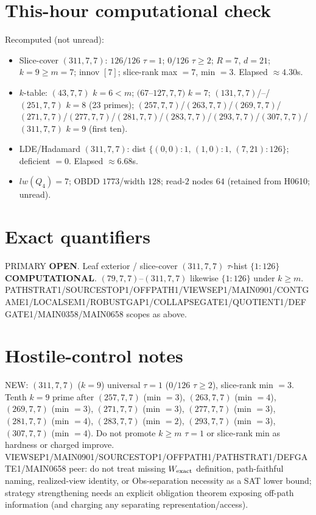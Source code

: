 \documentclass[11pt]{article}
\begin{document}
\section*{This-hour computational check}
Recomputed (not unread):
\begin{itemize}
\item Slice-cover $(311,7,7)$: $126/126$ $\tau{=}1$; $0/126$ $\tau{\ge}2$; $R{=}7$, $d{=}21$;
  $k{=}9{\ge}m{=}7$; innov $[7]$; slice-rank max $=7$, min $=3$. Elapsed $\approx4.30$s.
\item $k$-table: $(43,7,7)$ $k{=}6{<}m$; $(67$--$127,7,7)$ $k{=}7$;
  $(131,7,7)$/--/$(251,7,7)$ $k{=}8$ (23 primes); $(257,7,7)$/$(263,7,7)$/$(269,7,7)$/$(271,7,7)$/$(277,7,7)$/$(281,7,7)$/$(283,7,7)$/$(293,7,7)$/$(307,7,7)$/$(311,7,7)$ $k{=}9$ (first ten).
\item LDE/Hadamard $(311,7,7)$: dist $\{(0,0){:}1,\,(1,0){:}1,\,(7,21){:}126\}$; deficient $=0$. Elapsed $\approx6.68$s.
\item $lw(Q_4)=7$; OBDD $1773$/width $128$; read-$2$ nodes $64$ (retained from H0610; unread).
\end{itemize}

\section*{Exact quantifiers}
PRIMARY \textbf{OPEN}. Leaf exterior / slice-cover $(311,7,7)$ $\tau$-hist $\{1{:}126\}$ \textbf{COMPUTATIONAL}.
$(79,7,7)$--$(311,7,7)$ likewise $\{1{:}126\}$ under $k{\ge}m$.
PATHSTRAT1/SOURCESTOP1/OFFPATH1/VIEWSEP1/MAIN0901/CONTGAME1/LOCALSEM1/ROBUSTGAP1/COLLAPSEGATE1/QUOTIENT1/DEFGATE1/MAIN0358/MAIN0658 scopes as above.

\section*{Hostile-control notes}
NEW: $(311,7,7)$ ($k{=}9$) universal $\tau{=}1$ ($0/126$ $\tau{\ge}2$), slice-rank min $=3$.
Tenth $k{=}9$ prime after $(257,7,7)$ (min $=3$), $(263,7,7)$ (min $=4$), $(269,7,7)$ (min $=3$), $(271,7,7)$ (min $=3$), $(277,7,7)$ (min $=3$), $(281,7,7)$ (min $=4$), $(283,7,7)$ (min $=2$), $(293,7,7)$ (min $=3$), $(307,7,7)$ (min $=4$).
Do not promote $k{\ge}m$ $\tau{=}1$ or slice-rank min as hardness or charged improve.
VIEWSEP1/MAIN0901/SOURCESTOP1/OFFPATH1/PATHSTRAT1/DEFGATE1/MAIN0658 peer: do not treat missing $W_{\rm exact}$ definition,
path-faithful naming, realized-view identity, or Obs-separation necessity as a SAT lower bound;
strategy strengthening needs an explicit obligation theorem exposing off-path information
(and charging any separating representation/access).
\end{document}

